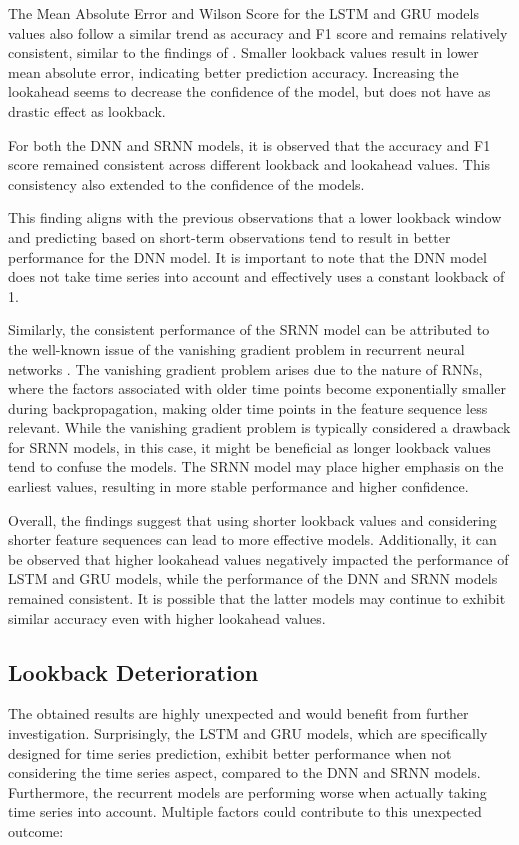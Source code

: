 The Mean Absolute Error and Wilson Score for the LSTM and GRU models values also follow a similar trend as accuracy and F1 score and remains relatively consistent, similar to the findings of \textcite{new2}. Smaller lookback values result in lower mean absolute error, indicating better prediction accuracy. Increasing the lookahead seems to decrease the confidence of the model, but does not have as drastic effect as lookback.

For both the DNN and SRNN models, it is observed that the accuracy and F1 score remained consistent across different lookback and lookahead values. This consistency also extended to the confidence of the models. 

This finding aligns with the previous observations that a lower lookback window and predicting based on short-term observations tend to result in better performance for the DNN model. It is important to note that the DNN model does not take time series into account and effectively uses a constant lookback of 1.

Similarly, the consistent performance of the SRNN model can be attributed to the well-known issue of the vanishing gradient problem in recurrent neural networks \cite{rnn-vanishing-gradient}. The vanishing gradient problem arises due to the nature of RNNs, where the factors associated with older time points become exponentially smaller during backpropagation, making older time points in the feature sequence less relevant. While the vanishing gradient problem is typically considered a drawback for SRNN models, in this case, it might be beneficial as longer lookback values tend to confuse the models. The SRNN model may place higher emphasis on the earliest values, resulting in more stable performance and higher confidence.

Overall, the findings suggest that using shorter lookback values and considering shorter feature sequences can lead to more effective models. Additionally, it can be observed that higher lookahead values negatively impacted the performance of LSTM and GRU models, while the performance of the DNN and SRNN models remained consistent. It is possible that the latter models may continue to exhibit similar accuracy even with higher lookahead values.

\subsection{Lookback Deterioration}

The obtained results are highly unexpected and would benefit from further investigation. Surprisingly, the LSTM and GRU models, which are specifically designed for time series prediction, exhibit better performance when not considering the time series aspect, compared to the DNN and SRNN models. Furthermore, the recurrent models are performing worse when actually taking time series into account. Multiple factors could contribute to this unexpected outcome:

